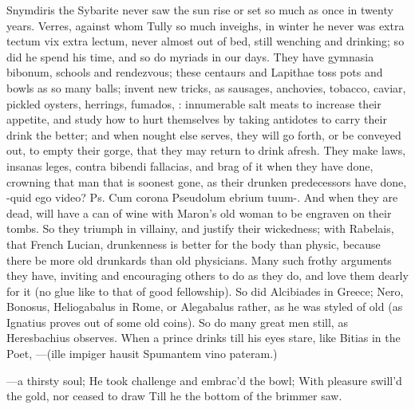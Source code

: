 {Snymdiris the Sybarite never saw the sun rise or set so much as once in
twenty years. Verres, against whom Tully so much inveighs, in winter he
never was extra tectum vix extra lectum, never almost out of bed,
 still wenching and drinking; so did he spend his time, and so do
myriads in our days. They have gymnasia bibonum, schools and
rendezvous; these centaurs and Lapithae toss pots and bowls as so many
balls; invent new tricks, as sausages, anchovies, tobacco, caviar,
pickled oysters, herrings, fumados, \etc{}: innumerable salt meats to
increase their appetite, and study how to hurt themselves by taking
antidotes to carry their drink the better; and when nought
else serves, they will go forth, or be conveyed out, to empty their
gorge, that they may return to drink afresh. They make laws, insanas
leges, contra bibendi fallacias, and brag of it when they have
done, crowning that man that is soonest gone, as their drunken
predecessors have done, -quid ego video? Ps. Cum corona Pseudolum
ebrium tuum-. And when they are dead, will have a can of wine with
Maron's old woman to be engraven on their tombs. So they triumph
in villainy, and justify their wickedness; with Rabelais, that French
Lucian, drunkenness is better for the body than physic, because there
be more old drunkards than old physicians. Many such frothy arguments
they have, inviting and encouraging others to do as they do, and
love them dearly for it (no glue like to that of good fellowship). So
did Alcibiades in Greece; Nero, Bonosus, Heliogabalus in Rome, or
Alegabalus rather, as he was styled of old (as Ignatius proves
out of some old coins). So do many great men still, as
Heresbachius observes. When a prince drinks till his eyes stare,
like Bitias in the Poet,
---(ille impiger hausit
Spumantem vino pateram.)

---a thirsty soul;
He took challenge and embrac'd the bowl;
With pleasure swill'd the gold, nor ceased to draw
Till he the bottom of the brimmer saw.

}
